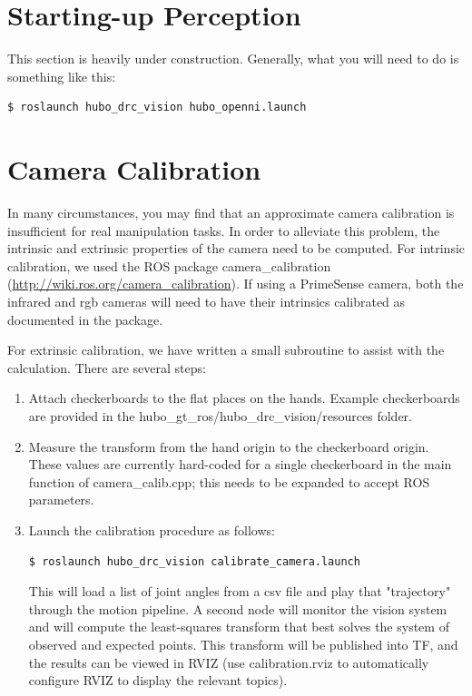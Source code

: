 \documentclass[letterpaper, 10 pt]{report}
\begin{document}
\section{Starting-up Perception} \label{sec:starting-up-perception}
This section is heavily under construction. Generally, what you will need to do is something like this:
  \begin{lstlisting}[language=bash]
    $ roslaunch hubo_drc_vision hubo_openni.launch
  \end{lstlisting}
  
\pagebreak
\section{Camera Calibration} \label{sec:calibration}
In many circumstances, you may find that an approximate camera calibration is insufficient for real manipulation tasks.
In order to alleviate this problem, the intrinsic and extrinsic properties of the camera need to be computed.
For intrinsic calibration, we used the ROS package camera\_calibration (\url{http://wiki.ros.org/camera_calibration}). If using a PrimeSense camera, both the infrared and rgb cameras will need to have their intrinsics calibrated as documented in the package.

For extrinsic calibration, we have written a small subroutine to assist with the calculation.
There are several steps:
\begin{enumerate}
  \item Attach checkerboards to the flat places on the hands. Example checkerboards are provided in the hubo\_gt\_ros/hubo\_drc\_vision/resources folder.
  \item Measure the transform from the hand origin to the checkerboard origin. These values are currently hard-coded for a single checkerboard in the main function of camera\_calib.cpp; this needs to be expanded to accept ROS parameters.
  \item Launch the calibration procedure as follows:
  \begin{lstlisting}[language=bash]
    $ roslaunch hubo_drc_vision calibrate_camera.launch
  \end{lstlisting}
  This will load a list of joint angles from a csv file and play that "trajectory" through the motion pipeline. A second node will monitor the vision system and will compute the least-squares transform that best solves the system of observed and expected points. This transform will be published into TF, and the results can be viewed in RVIZ (use calibration.rviz to automatically configure RVIZ to display the relevant topics).
\end{enumerate}
\end{document}
